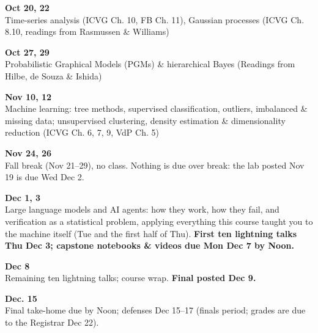 \begin{innerlist}
\item {\bf\headerfont\color{RoyalBlue} Oct 20, 22}\\ Time-series analysis (ICVG Ch. 10, FB Ch. 11), Gaussian processes (ICVG Ch. 8.10, readings from Rasmussen \& Williams)\smallskip

\item {\bf\headerfont\color{RoyalBlue} Oct 27, 29}\\ Probabilistic Graphical Models (PGMs) \& hierarchical Bayes (Readings from Hilbe, de Souza \& Ishida)\smallskip

\item[] \smallskip

\item {\bf\headerfont\color{RoyalBlue} Nov 10, 12}\\ Machine learning: tree methods, supervised classification, outliers, imbalanced \& missing data; unsupervised clustering, density estimation \& dimensionality reduction (ICVG Ch. 6, 7, 9, VdP Ch. 5)\smallskip

\item[] \smallskip

\item {\bf\headerfont\color{RoyalBlue} Nov 24, 26}\\ {\color{Red} Fall break (Nov 21--29), no class.} Nothing is due over break: the lab posted Nov 19 is due Wed Dec 2.\smallskip

\item {\bf\headerfont\color{RoyalBlue} Dec 1, 3}\\ Large language models and AI agents: how they work, how they fail, and verification as a statistical problem, applying everything this course taught you to the machine itself (Tue and the first half of Thu). {\bf First ten lightning talks Thu Dec 3; capstone notebooks \& videos due Mon Dec 7 by Noon.}\smallskip

\item {\bf\headerfont\color{RoyalBlue} Dec 8}\\ Remaining ten lightning talks; course wrap. {\bf Final posted Dec 9.}\smallskip

\item {\bf\headerfont\color{Red} Dec. 15\nth}\\ Final take-home due by Noon; defenses Dec 15--17 (finals period; grades are due to the Registrar Dec 22).\smallskip
\end{innerlist}
\smallskip
